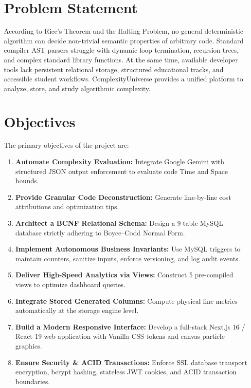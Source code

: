 \documentclass[12pt,a4paper]{report}
\DeclareRobustCommand{\_}{\textunderscore\allowbreak}
\begin{document}
\section{Problem Statement}
According to Rice's Theorem and the Halting Problem, no general deterministic algorithm can decide non-trivial semantic properties of arbitrary code. Standard compiler AST parsers struggle with dynamic loop termination, recursion trees, and complex standard library functions. At the same time, available developer tools lack persistent relational storage, structured educational tracks, and accessible student workflows. ComplexityUniverse provides a unified platform to analyze, store, and study algorithmic complexity.

\section{Objectives}
The primary objectives of the project are:
\begin{enumerate}
    \item \textbf{Automate Complexity Evaluation:} Integrate Google Gemini with structured JSON output enforcement to evaluate code Time and Space bounds.
    \item \textbf{Provide Granular Code Deconstruction:} Generate line-by-line cost attributions and optimization tips.
    \item \textbf{Architect a BCNF Relational Schema:} Design a 9-table MySQL database strictly adhering to Boyce--Codd Normal Form.
    \item \textbf{Implement Autonomous Business Invariants:} Use MySQL triggers to maintain counters, sanitize inputs, enforce versioning, and log audit events.
    \item \textbf{Deliver High-Speed Analytics via Views:} Construct 5 pre-compiled views to optimize dashboard queries.
    \item \textbf{Integrate Stored Generated Columns:} Compute physical line metrics automatically at the storage engine level.
    \item \textbf{Build a Modern Responsive Interface:} Develop a full-stack Next.js 16 / React 19 web application with Vanilla CSS tokens and canvas particle graphics.
    \item \textbf{Ensure Security \& ACID Transactions:} Enforce SSL database transport encryption, bcrypt hashing, stateless JWT cookies, and ACID transaction boundaries.
\end{enumerate}
\end{document}
